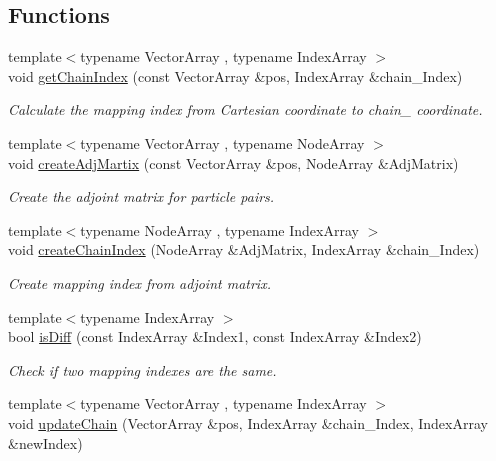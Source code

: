 \subsection*{Functions}
\begin{DoxyCompactItemize}
\item 
{\footnotesize template$<$typename Vector\+Array , typename Index\+Array $>$ }\\void \mbox{\hyperlink{namespace_space_h_1_1chain_a9f1ed51f097bc8cf691a87b97639dde9}{get\+Chain\+Index}} (const Vector\+Array \&pos, Index\+Array \&chain_\+Index)
\begin{DoxyCompactList}\small\item\em Calculate the mapping index from Cartesian coordinate to chain_ coordinate. \end{DoxyCompactList}\item
{\footnotesize template$<$typename Vector\+Array , typename Node\+Array $>$ }\\void \mbox{\hyperlink{namespace_space_h_1_1chain_a8d2f8c8026f24294d16309c4f2e11fdb}{create\+Adj\+Martix}} (const Vector\+Array \&pos, Node\+Array \&Adj\+Matrix)
\begin{DoxyCompactList}\small\item\em Create the adjoint matrix for particle pairs. \end{DoxyCompactList}\item 
{\footnotesize template$<$typename Node\+Array , typename Index\+Array $>$ }\\void \mbox{\hyperlink{namespace_space_h_1_1chain_a65d906373401066033d8e4a6ad581cce}{create\+Chain\+Index}} (Node\+Array \&Adj\+Matrix, Index\+Array \&chain_\+Index)
\begin{DoxyCompactList}\small\item\em Create mapping index from adjoint matrix. \end{DoxyCompactList}\item 
{\footnotesize template$<$typename Index\+Array $>$ }\\bool \mbox{\hyperlink{namespace_space_h_1_1chain_ab54ce920a542c01625ee7d6c625cc5c4}{is\+Diff}} (const Index\+Array \&Index1, const Index\+Array \&Index2)
\begin{DoxyCompactList}\small\item\em Check if two mapping indexes are the same. \end{DoxyCompactList}\item 
{\footnotesize template$<$typename Vector\+Array , typename Index\+Array $>$ }\\void \mbox{\hyperlink{namespace_space_h_1_1chain_a631ad6a37f246a0db64e5879825a6878}{update\+Chain}} (Vector\+Array \&pos, Index\+Array \&chain_\+Index, Index\+Array \&new\+Index)

\end{DoxyCompactItemize}
